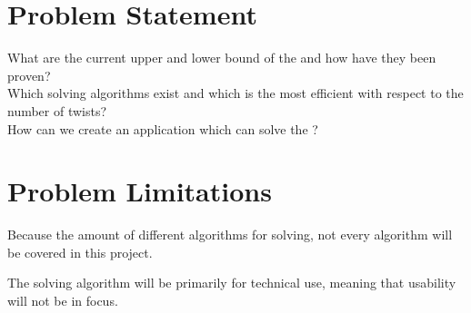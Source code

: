 \section{Problem Statement}
What are the current upper and lower bound of the \rubik{} and how have they been proven? \\
Which solving algorithms exist and which is the most efficient with respect to the number of twists?\\
How can we create an application which can solve the \rubik{}?

\section{Problem Limitations}
Because the amount of different algorithms for \rubik{} solving, not every algorithm will be covered in this project.

The \rubik{} solving algorithm will be primarily for technical use, meaning that usability will not be in focus.
